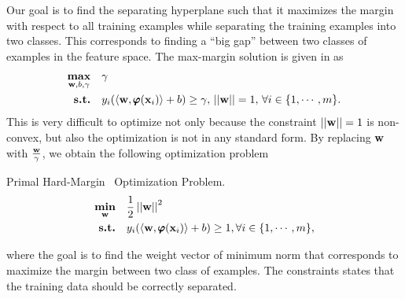 {Our goal is to find the separating hyperplane such that it maximizes the margin with respect to all training examples while separating the training examples into two classes.
This corresponds to finding a ``big gap'' between two classes of examples in the feature space.
The max-margin solution is given in \citep{Bishop07} as
\begin{align*}
	\underset{\mathbf {w},b,\gamma}{\textbf{max}} &\quad \gamma\\
	\textbf{s.t.} &\quad y_i(\langle \mathbf {w}, \pmb \varphi(\mathbf {x}_i) \rangle+b) \ge \gamma, \, \left|\left| \mathbf {w} \right|\right|=1, \, \forall i\in\{1,\cdots,m\}.
\end{align*}
This is very difficult to optimize not only because the constraint $\left|\left| \mathbf {w} \right|\right|=1$ is non-convex, but also the optimization is not in any standard form.
By replacing $\mathbf {w}$ with $\frac{\mathbf {w}}{\gamma}$, we obtain the following optimization problem

\begin{definition}{Primal Hard-Margin \svm\ Optimization Problem.}\label{hardsvmprimal}
	\begin{align*}
		\underset{\mathbf {w}}{\textbf{min}} & \quad\frac{1}{2}\left|\left| \mathbf {w} \right|\right|^2\\
		\textbf{s.t.} & \quad y_i(\langle \mathbf {w}, \pmb \varphi(\mathbf {x}_i) \rangle + b) \ge 1, \forall i\in\{1,\cdots,m\},
	\end{align*}
\end{definition}
where the goal is to find the weight vector of minimum norm that corresponds to maximize the margin between two class of examples.
The constraints states that the training data should be correctly separated.

}
